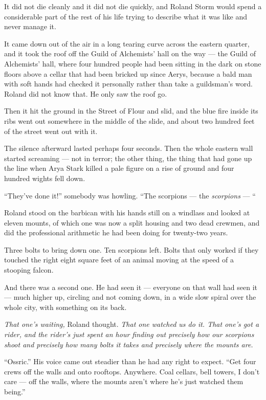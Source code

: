 \sceneBreak

It did not die cleanly and it did not die quickly, and Roland Storm would spend a considerable part of the rest of his life trying to describe what it was like and never manage it.

It came down out of the air in a long tearing curve across the eastern quarter, and it took the roof off the Guild of Alchemists’ hall on the way — the Guild of Alchemists’ hall, where four hundred people had been sitting in the dark on stone floors above a cellar that had been bricked up since Aerys, because a bald man with soft hands had checked it personally rather than take a guildsman’s word. Roland did not know that. He only saw the roof go.

Then it hit the ground in the Street of Flour and slid, and the blue fire inside its ribs went out somewhere in the middle of the slide, and about two hundred feet of the street went out with it.

The silence afterward lasted perhaps four seconds. Then the whole eastern wall started screaming — not in terror; the other thing, the thing that had gone up the line when Arya Stark killed a pale figure on a rise of ground and four hundred wights fell down.

“They’ve done it!” somebody was howling. “The scorpions — the \textit{scorpions} — “

Roland stood on the barbican with his hands still on a windlass and looked at eleven mounts, of which one was now a split housing and two dead crewmen, and did the professional arithmetic he had been doing for twenty-two years.

Three bolts to bring down one. Ten scorpions left. Bolts that only worked if they touched the right eight square feet of an animal moving at the speed of a stooping falcon.

And there was a second one. He had seen it — everyone on that wall had seen it — much higher up, circling and not coming down, in a wide slow spiral over the whole city, with something on its back.

\textit{That one’s waiting,} Roland thought. \textit{That one watched us do it. That one’s got a rider, and the rider’s just spent an hour finding out precisely how our scorpions shoot and precisely how many bolts it takes and precisely where the mounts are.}

“Ossric.” His voice came out steadier than he had any right to expect. “Get four crews off the walls and onto rooftops. Anywhere. Coal cellars, bell towers, I don’t care — off the walls, where the mounts aren’t where he’s just watched them being.”

